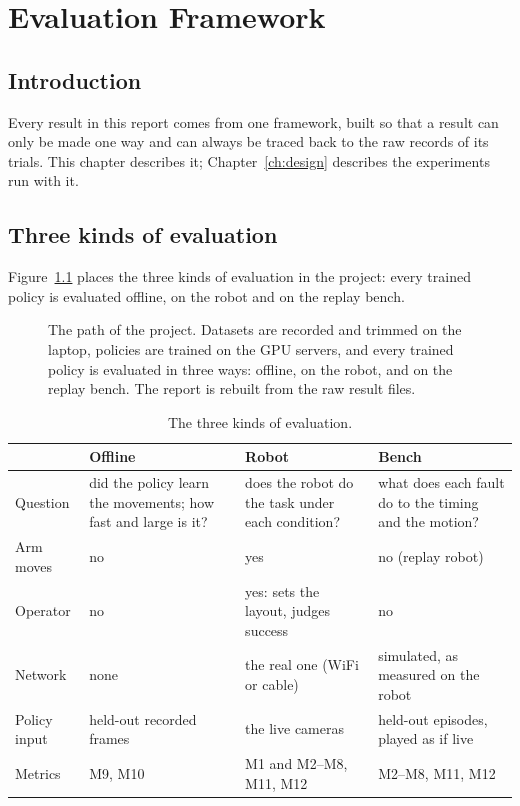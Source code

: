 \chapter{Evaluation Framework}\label{ch:evaluation}

\section{Introduction}

Every result in this report comes from one framework, built so that a result can only be made one way and can always
be traced back to the raw records of its trials. This chapter describes it; Chapter~\ref{ch:design} describes the
experiments run with it.

\section{Three kinds of evaluation}\label{sec:three-evals}

Figure~\ref{fig:pipeline} places the three kinds of evaluation in the project: every trained policy is evaluated
offline, on the robot and on the replay bench.

\begin{figure}[htbp]
  \centering
  
  \caption{The path of the project. Datasets are recorded and trimmed on the laptop, policies are trained on the GPU
           servers, and every trained policy is evaluated in three ways: offline, on the robot, and on the replay
           bench. The report is rebuilt from the raw result files.}
  \label{fig:pipeline}
\end{figure}

\begin{table}[htbp]
  \centering
  \small
  \begin{tabularx}{\textwidth}{l X X X}
    \toprule
    & Offline & Robot & Bench \\
    \midrule
    Question & did the policy learn the movements; how fast and large is it? & does the robot do the task under
      each condition? & what does each fault do to the timing and the motion? \\
    Arm moves & no & yes & no (replay robot) \\
    Operator & no & yes: sets the layout, judges success & no \\
    Network & none & the real one (WiFi or cable) & simulated, as measured on the robot \\
    Policy input & held-out recorded frames & the live cameras & held-out episodes, played as if live \\
    Metrics & M9, M10 & M1 and M2--M8, M11, M12 & M2--M8, M11, M12 \\
    \bottomrule
  \end{tabularx}
  \caption{The three kinds of evaluation.}\label{tab:evalkinds}
\end{table}

